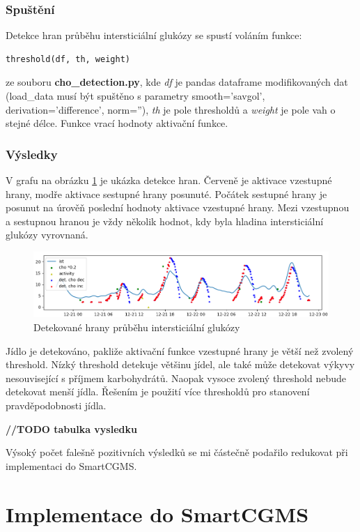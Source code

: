 \subsubsection{Spuštění}

Detekce hran průběhu intersticiální glukózy se spustí voláním funkce:
\begin{verbatim}
threshold(df, th, weight)
\end{verbatim}
ze souboru \textbf{cho\_detection.py}, kde \textit{df} je pandas dataframe modifikovaných dat (load\_data musí být spuštěno s parametry smooth='savgol', derivation='difference', norm=''), \textit{th} je pole thresholdů a \textit{weight} je pole vah o stejné délce. Funkce vrací hodnoty aktivační funkce.

\subsubsection{Výsledky}
V grafu na obrázku \ref{fig:hrany} je ukázka detekce hran. Červeně je aktivace vzestupné hrany, modře aktivace sestupné hrany posunuté. Počátek sestupné hrany je posunut na úrověň poslední hodnoty aktivace vzestupné hrany. Mezi vzestupnou a sestupnou hranou je vždy několik hodnot, kdy byla hladina intersticiální glukózy vyrovnaná.

\begin{figure}[H]
\caption{Detekované hrany průběhu intersticiální glukózy}
\label{fig:hrany}
\centering
\includegraphics[width=1\textwidth]{img/cho/hrany.png}
\end{figure}

Jídlo je detekováno, pakliže aktivační funkce vzestupné hrany je větší než zvolený threshold. Nízký threshold detekuje většinu jídel, ale také může detekovat výkyvy nesouvisející s příjmem karbohydrátů. Naopak vysoce zvolený threshold nebude detekovat menší jídla. Řešením je použití více thresholdů pro stanovení pravděpodobnosti jídla.

\textbf{//TODO tabulka vysledku}

Výsoký počet falešně pozitivních výsledků se mi částečně podařilo redukovat při implementaci do SmartCGMS.


\section{Implementace do SmartCGMS}

